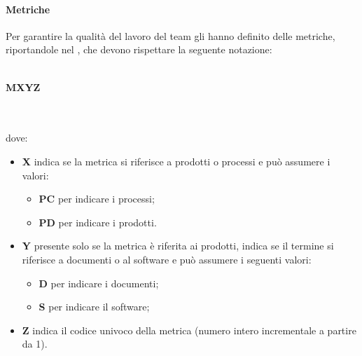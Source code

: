 \paragraph{Metriche}
Per garantire la qualità del lavoro del team gli \AMMP{} hanno definito delle metriche, riportandole
nel \PQdoc, che devono rispettare la seguente notazione:\\ \\
\centerline{\textbf{M\textbraceleft{}X\textbraceright{}\textbraceleft{}Y\textbraceright{}\textbraceleft{}Z\textbraceright{}}} \\ \\
dove:
\begin{itemize}
	\item \textbf{X} indica se la metrica si riferisce a prodotti o processi e può assumere
	i valori:
	\begin{itemize}
		\item \textbf{PC} per indicare i processi;
		\item \textbf{PD} per indicare i prodotti.
	\end{itemize}
	\item \textbf{Y} presente solo se la metrica è riferita ai prodotti, indica se il termine  si riferisce a documenti o al software e può assumere i seguenti valori:
	\begin{itemize}
		\item \textbf{D} per indicare i documenti;
		\item \textbf{S} per indicare il software;
	\end{itemize}
	\item \textbf{Z} indica il codice univoco della metrica (numero intero incrementale a partire da 1).
\end{itemize}
